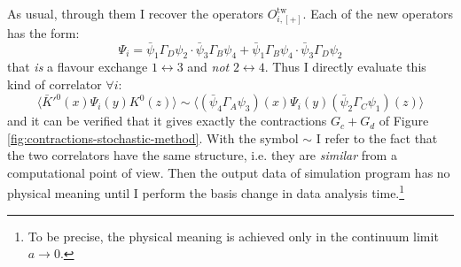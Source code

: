 \documentclass[english, LaM, oneside, noexaminfo]{sapthesis}
\begin{document}
As usual, through them I recover the operators $O_{i,[+]}^\text{tw}$.
Each of the new operators has the form:
$$\Psi_i = \bar\psi_1 \Gamma_D \psi_2 \cdot \bar\psi_3 \Gamma_B \psi_4 + \bar\psi_1 \Gamma_B \psi_4 \cdot \bar\psi_3 \Gamma_D \psi_2$$
that {\it is} a flavour exchange $1 \leftrightarrow 3$ and {\it not} $2 \leftrightarrow 4$.
Thus I directly evaluate this kind of correlator $\forall i$:
$$\bigg\langle \bar K'^0(x) \Psi_i (y) K^0(z) \bigg\rangle \sim \bigg\langle \left(\bar\psi_4 \Gamma_A \psi_3 \right) (x) \Psi_i (y) \left(\bar\psi_2 \Gamma_C \psi_1 \right) (z) \bigg\rangle$$
and it can be verified that it gives exactly the contractions $G_c + G_d$ of Figure \ref{fig:contractions-stochastic-method}.
With the symbol $\sim$ I refer to the fact that the two correlators have the same structure, i.e. they are {\it similar} from a computational point of view.
Then the output data of simulation program has no physical meaning until I perform the basis change in data analysis time.\footnote{To be precise, the physical meaning is achieved only in the continuum limit $a \rightarrow 0$.}
\end{document}
